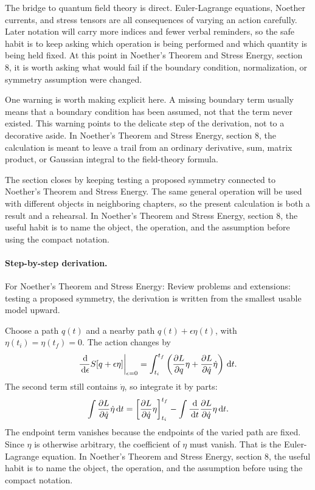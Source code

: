 The bridge to quantum field theory is direct.  Euler-Lagrange equations, Noether currents, and stress tensors are all consequences of varying an action carefully.  Later notation will carry more indices and fewer verbal reminders, so the safe habit is to keep asking which operation is being performed and which quantity is being held fixed.  At this point in Noether's Theorem and Stress Energy, section 8, it is worth asking what would fail if the boundary condition, normalization, or symmetry assumption were changed.

One warning is worth making explicit here.  A missing boundary term usually means that a boundary condition has been assumed, not that the term never existed.  This warning points to the delicate step of the derivation, not to a decorative aside.  In Noether's Theorem and Stress Energy, section 8, the calculation is meant to leave a trail from an ordinary derivative, sum, matrix product, or Gaussian integral to the field-theory formula.

The section closes by keeping testing a proposed symmetry connected to Noether's Theorem and Stress Energy.  The same general operation will be used with different objects in neighboring chapters, so the present calculation is both a result and a rehearsal.  In Noether's Theorem and Stress Energy, section 8, the useful habit is to name the object, the operation, and the assumption before using the compact notation.



\paragraph{Step-by-step derivation.}

For Noether's Theorem and Stress Energy: Review problems and extensions: testing a proposed symmetry, the derivation is written from the smallest usable model upward.

Choose a path \(q(t)\) and a nearby path \(q(t)+\epsilon\eta(t)\), with \(\eta(t_i)=\eta(t_f)=0\).  The action changes by
\[
  \frac{\,\mathrm d}{\,\mathrm d\epsilon}S[q+\epsilon\eta]\bigg|_{\epsilon=0}
  =
  \int_{t_i}^{t_f}
  \left(
  \frac{\partial L}{\partial q}\eta+\frac{\partial L}{\partial\dot q}\dot\eta
  \right)\,\mathrm d t.
\]
The second term still contains \(\dot\eta\), so integrate it by parts:
\[
  \int \frac{\partial L}{\partial\dot q}\dot\eta\,\mathrm d t
  =
  \left[\frac{\partial L}{\partial\dot q}\eta\right]_{t_i}^{t_f}
  -
  \int \frac{\,\mathrm d}{\,\mathrm d t}\frac{\partial L}{\partial\dot q}\eta\,\mathrm d t.
\]
The endpoint term vanishes because the endpoints of the varied path are fixed.  Since \(\eta\) is otherwise arbitrary, the coefficient of \(\eta\) must vanish.  That is the Euler-Lagrange equation.  In Noether's Theorem and Stress Energy, section 8, the useful habit is to name the object, the operation, and the assumption before using the compact notation.

